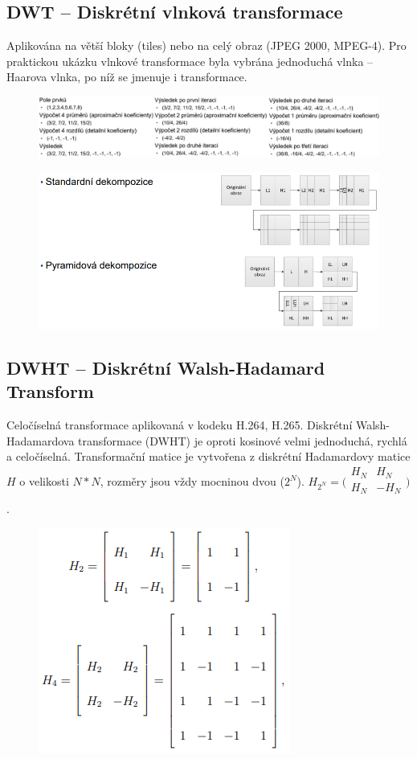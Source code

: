 \subsection{DWT -- Diskrétní vlnková transformace}

Aplikována na větší bloky (tiles) nebo na celý obraz (JPEG 2000, MPEG-4). Pro praktickou ukázku vlnkové transformace byla vybrána jednoduchá vlnka – Haarova
vlnka, po níž se jmenuje i transformace.

\begin{figure}[ht]
    \centering
    \includegraphics[width=1\linewidth]{MPC-ZMD//images/dwt2.png}
\end{figure}
\FloatBarrier

\begin{figure}[ht]
    \centering
    \includegraphics[width=0.7\linewidth]{MPC-ZMD//images/dwt.png}
\end{figure}
\FloatBarrier

\subsection{DWHT -- Diskrétní Walsh-Hadamard Transform}

Celočíselná transformace aplikovaná v kodeku H.264, H.265. Diskrétní Walsh-Hadamardova transformace (DWHT) je oproti kosinové velmi jednoduchá, rychlá a celočíselná. Transformační matice je vytvořena z diskrétní Hadamardovy matice $H$ o velikosti $N*N$, rozměry jsou vždy mocninou dvou ($2^N$). $H_{2^N}=\bigl(\begin{smallmatrix}
H_{N} & H_{N} \\
H_{N} & -H_{N} \\
\end{smallmatrix}\bigr)$.

\begin{figure}[ht]
    \centering
    \includegraphics[width=0.3\linewidth]{MPC-ZMD//images/wht.png}
\end{figure}
\FloatBarrier

